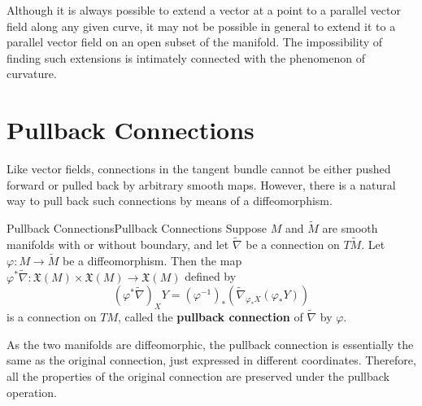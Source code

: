 \documentclass[../main.tex]{subfiles}
\begin{document}
\begin{remark}
	Although it is always possible to extend a vector at a point to a parallel vector field along any given curve, it may not be possible in general to extend it to a parallel vector field on an open subset of the manifold. The impossibility of finding such extensions is intimately connected with the phenomenon of curvature.
\end{remark}

\section{Pullback Connections}
Like vector fields, connections in the tangent bundle cannot be either pushed forward or pulled back by arbitrary smooth maps. However, there is a natural way to pull back such connections by means of a diffeomorphism.

\begin{lemma}{Pullback Connections}{Pullback Connections}
	Suppose $M$ and $\tilde{M}$ are smooth manifolds with or without boundary, and let $\tilde{\nabla}$ be a connection on $T\tilde{M}$. Let $\varphi:M\to \tilde{M}$ be a diffeomorphism. Then the map $\varphi^* \tilde{\nabla} : \mathfrak{X}(M) \times \mathfrak{X}(M) \to \mathfrak{X}(M)$ defined by
	\begin{equation}
		(\varphi^* \tilde{\nabla})_X Y = (\varphi^{-1})_* (\tilde{\nabla}_{\varphi_* X} (\varphi_* Y))
	\end{equation}
	is a connection on $TM$, called the \textbf{pullback connection} of $\tilde{\nabla}$ by $\varphi$.
\end{lemma}

As the two manifolds are diffeomorphic, the pullback connection is essentially the same as the original connection, just expressed in different coordinates. Therefore, all the properties of the original connection are preserved under the pullback operation.
\end{document}
